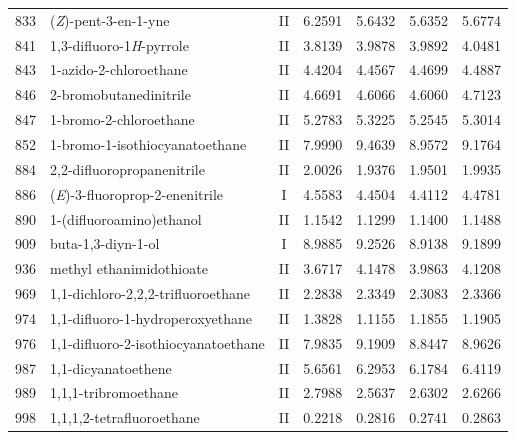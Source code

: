 \begin{longtable}{rlcd{2.5}d{2.5}d{2.5}d{2.5}}
    833  & (\textit{Z})-pent-3-en-1-yne                           & II & 6.2591  & 5.6432  & 5.6352  & 5.6774  \\
    841  & 1,3-difluoro-1\textit{H}-pyrrole                       & II & 3.8139  & 3.9878  & 3.9892  & 4.0481  \\
    843  & 1-azido-2-chloroethane                                 & II & 4.4204  & 4.4567  & 4.4699  & 4.4887  \\
    846  & 2-bromobutanedinitrile                                 & II & 4.6691  & 4.6066  & 4.6060  & 4.7123  \\
    847  & 1-bromo-2-chloroethane                                 & II & 5.2783  & 5.3225  & 5.2545  & 5.3014  \\
    852  & 1-bromo-1-isothiocyanatoethane                         & II & 7.9990  & 9.4639  & 8.9572  & 9.1764  \\
    884  & 2,2-difluoropropanenitrile                             & II & 2.0026  & 1.9376  & 1.9501  & 1.9935  \\
    886  & (\textit{E})-3-fluoroprop-2-enenitrile                 & I  & 4.5583  & 4.4504  & 4.4112  & 4.4781  \\
    890  & 1-(difluoroamino)ethanol                               & II & 1.1542  & 1.1299  & 1.1400  & 1.1488  \\
    909  & buta-1,3-diyn-1-ol                                     & I  & 8.9885  & 9.2526  & 8.9138  & 9.1899  \\
    936  & methyl ethanimidothioate                               & II & 3.6717  & 4.1478  & 3.9863  & 4.1208  \\
    969  & 1,1-dichloro-2,2,2-trifluoroethane                     & II & 2.2838  & 2.3349  & 2.3083  & 2.3366  \\
    974  & 1,1-difluoro-1-hydroperoxyethane                       & II & 1.3828  & 1.1155  & 1.1855  & 1.1905  \\
    976  & 1,1-difluoro-2-isothiocyanatoethane                    & II & 7.9835  & 9.1909  & 8.8447  & 8.9626  \\
    987  & 1,1-dicyanatoethene                                    & II & 5.6561  & 6.2953  & 6.1784  & 6.4119  \\
    989  & 1,1,1-tribromoethane                                   & II & 2.7988  & 2.5637  & 2.6302  & 2.6266  \\
    998  & 1,1,1,2-tetrafluoroethane                              & II & 0.2218  & 0.2816  & 0.2741  & 0.2863  \\

\end{longtable}
